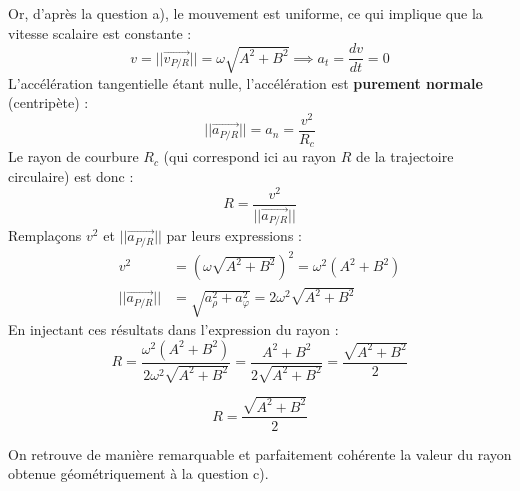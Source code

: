 \documentclass[11pt,a4paper]{article}
\begin{document}
Or, d'après la question a), le mouvement est uniforme, ce qui implique que la vitesse scalaire est constante :
$$ v = ||\vec{v_{P/R}}|| = \omega \sqrt{A^2 + B^2} \implies a_t = \frac{dv}{dt} = 0 $$
L'accélération tangentielle étant nulle, l'accélération est \textbf{purement normale} (centripète) :
$$ ||\vec{a_{P/R}}|| = a_n = \frac{v^2}{R_c} $$
Le rayon de courbure $R_c$ (qui correspond ici au rayon $R$ de la trajectoire circulaire) est donc :
$$ R = \frac{v^2}{||\vec{a_{P/R}}||} $$
Remplaçons $v^2$ et $||\vec{a_{P/R}}||$ par leurs expressions :
\begin{align*}
v^2 &= \left(\omega \sqrt{A^2 + B^2}\right)^2 = \omega^2 (A^2 + B^2) \\
||\vec{a_{P/R}}|| &= \sqrt{a_\rho^2 + a_\varphi^2} = 2\omega^2 \sqrt{A^2 + B^2}
\end{align*}
En injectant ces résultats dans l'expression du rayon :
$$ R = \frac{\omega^2 (A^2 + B^2)}{2\omega^2 \sqrt{A^2 + B^2}} = \frac{A^2 + B^2}{2\sqrt{A^2 + B^2}} = \frac{\sqrt{A^2 + B^2}}{2} $$
\begin{sonucbox}
$$ R = \frac{\sqrt{A^2 + B^2}}{2} $$
\end{sonucbox}
On retrouve de manière remarquable et parfaitement cohérente la valeur du rayon obtenue géométriquement à la question c).
\end{document}
